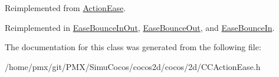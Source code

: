 Reimplemented from \hyperlink{classActionEase_ab99eb083fa033fae1d6c948fdc730782}{Action\+Ease}.



Reimplemented in \hyperlink{classEaseBounceInOut_a5fce37e1a14d4f5ed99d19fad6b354f9}{Ease\+Bounce\+In\+Out}, \hyperlink{classEaseBounceOut_a03b87127deebcdf81cc7422690d0375e}{Ease\+Bounce\+Out}, and \hyperlink{classEaseBounceIn_aac86ecee50c41de2e0b4047cf8047949}{Ease\+Bounce\+In}.



The documentation for this class was generated from the following file\+:\begin{DoxyCompactItemize}
\item 
/home/pmx/git/\+P\+M\+X/\+Simu\+Cocos/cocos2d/cocos/2d/C\+C\+Action\+Ease.\+h\end{DoxyCompactItemize}
